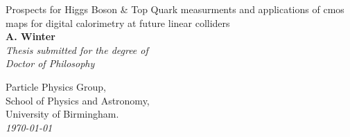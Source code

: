 \documentclass[a4paper,twoside,12pt]{report}
\newcommand{\thesistitle}{Prospects for Higgs Boson \& Top Quark measurments and applications of cmos maps for digital calorimetry at future linear colliders} %
\newcommand{\thesisauthor}{A. Winter} %
\newcommand{\thesiscrest}{crest_2}
\begin{document}
\begin{titlepage}
  \begin{center}
    {\huge\sc \thesistitle}\\
    \vspace{3.0cm}
    {\Large\bf \thesisauthor}\\
    \vspace{1.5cm}
    {\large\em Thesis submitted for the degree of}\\
    {\large\em Doctor of Philosophy}\\
    \vspace{1.5cm}
  \end{center}
  \begin{center}
  \end{center}
  \begin{flushleft}
    \hspace{7.5cm} Particle Physics Group, \\
    \hspace{7.5cm} School of Physics and Astronomy, \\
    \hspace{7.5cm} University of Birmingham. \\
    \vspace{1cm}
    \hspace{7.5cm} \emph{\today} \\
  \end{flushleft}
  \begin{center}
  \end{center}
\end{titlepage}

\thispagestyle{empty}%
~
\newpage
\thispagestyle{empty}%
~
\newpage


\pagestyle{fancy} %
\fancyfoot{} %
\fancyhead{}
\fancyhead[RE]{\sf \slshape \rightmark \hspace{5mm} \thepage }
\fancyhead[LO]{\sf \thepage \hspace{5mm} \slshape \leftmark }

\setcounter{tocdepth}{3}
\setcounter{secnumdepth}{3}
\renewcommand\tocloftpagestyle{fancy}
\renewcommand\cftchapfont{\large\sf}
\renewcommand\cftsecfont{\normalsize \sf}
\renewcommand\cftsubsecfont{\small\sf}
\renewcommand\cftsubsubsecfont{\footnotesize \sf}
%
\renewcommand\cftchappagefont{\bfseries\sffamily}
\renewcommand\cftsecpagefont{\bfseries\sffamily}
\renewcommand\cftsubsecpagefont{\bfseries\sffamily}
\renewcommand\cftsubsubsecpagefont{\bfseries\sffamily}
%
\renewcommand\cftloftitlefont{\Huge\sf}
\renewcommand\cftlottitlefont{\Huge\sf}
\renewcommand\cfttoctitlefont{\Huge\sf}
\end{document}
